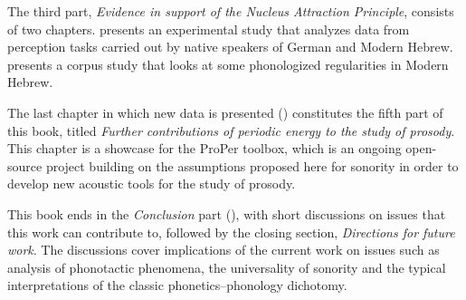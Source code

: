 The third part, \emph{Evidence in support of the Nucleus Attraction Principle}, consists of two chapters.  presents an experimental study that analyzes data from perception tasks carried out by native speakers of German and Modern Hebrew.  presents a corpus study that looks at some phonologized regularities in Modern Hebrew.

The last chapter in which new data is presented () constitutes the fifth part of this book, titled \emph{Further contributions of periodic energy to the study of prosody}. This chapter is a showcase for the ProPer toolbox, which is an ongoing open-source project building on the assumptions proposed here for sonority in order to develop new acoustic tools for the study of prosody.

This book ends in the \emph{Conclusion} part (), with short discussions on issues that this work can contribute to, followed by the closing section, \emph{Directions for future work}.
The discussions cover implications of the current work on issues such as analysis of phonotactic phenomena, %
the universality of sonority and the typical interpretations of the classic phonetics--phonology dichotomy.


